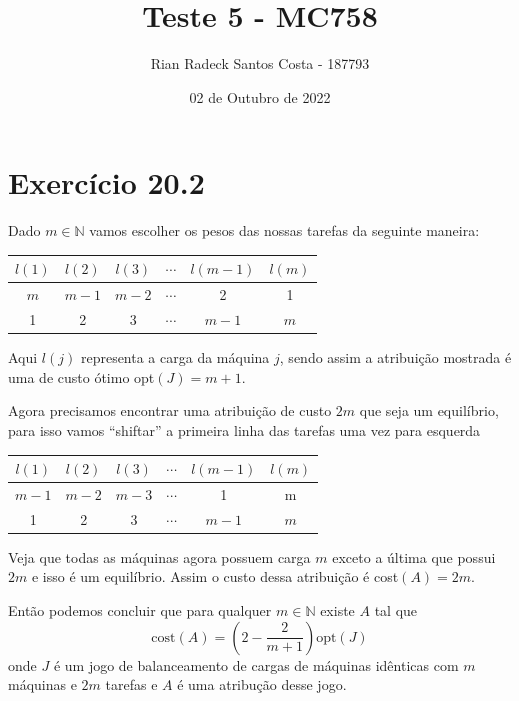 \documentclass[12pt, letterpaper]{article}
\title{Teste 5 - MC758}
\author{Rian Radeck Santos Costa - 187793}
\date{02 de Outubro de 2022}
\begin{document}
\maketitle
{}
\newpage

\section{Exercício 20.2}
	Dado $m \in \mathbb{N}$ vamos escolher os pesos das nossas tarefas da seguinte maneira:

	\begin{center}
	\begin{tabular}{||c c c c c c||} 
		\hline
		$l(1)$ & $l(2)$ & $l(3)$ & $\cdots$ & $l(m - 1)$ & $l(m)$ \\ 
		\hline\hline
		$m$ & $m - 1$ & $m - 2$ & $\cdots$ & 2 & 1 \\
		\hline
		1 & 2 & 3 & $\cdots$ & $m - 1$ & $m$ \\ 
		\hline
	\end{tabular}
	\end{center}

	Aqui $l(j)$ representa a carga da máquina $j$, sendo assim a atribuição mostrada é uma de custo ótimo opt$(J) = m + 1$.

	Agora precisamos encontrar uma atribuição de custo $2m$ que seja um equilíbrio, para isso vamos ``shiftar'' a primeira linha das tarefas uma vez para esquerda

	\begin{center}
	\begin{tabular}{||c c c c c c||} 
		\hline
		$l(1)$ & $l(2)$ & $l(3)$ & $\cdots$ & $l(m - 1)$ & $l(m)$ \\ 
		\hline\hline
		$m - 1$ & $m - 2$ & $m - 3$ & $\cdots$ & 1 & m \\
		\hline
		1 & 2 & 3 & $\cdots$ & $m - 1$ & $m$ \\ 
		\hline
	\end{tabular}
	\end{center}

	Veja que todas as máquinas agora possuem carga $m$ exceto a última que possui $2m$ e isso é um equilíbrio. Assim o custo dessa atribuição é cost$(A) = 2m$.

	Então podemos concluir que para qualquer $m \in \mathbb{N}$ existe $A$ tal que $$\textrm{cost}(A) = \left(2 - \frac{2}{m + 1} \right) \textrm{opt}(J)$$onde $J$ é um jogo de balanceamento de cargas de máquinas idênticas com $m$ máquinas e $2m$ tarefas e $A$ é uma atribução desse jogo.
\end{document}
